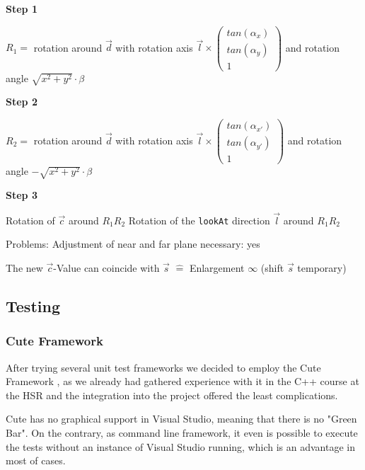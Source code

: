 \noindent\textbf{Step 1}

$R_{1} = $ rotation around $\overrightarrow{d}$ with rotation axis   $\overrightarrow{l} \times \left(\begin{smallmatrix}tan (\alpha_{x}) \\ tan (\alpha_{y}) \\ 1\end{smallmatrix}\right)$ and rotation angle $\sqrt{x^{2} + y^{2}} \cdot \beta $

\noindent\textbf{Step 2}

$R_{2} = $ rotation around $\overrightarrow{d}$ with rotation axis   $\overrightarrow{l} \times \left(\begin{smallmatrix}tan (\alpha_{x'}) \\ tan (\alpha_{y'}) \\ 1\end{smallmatrix}\right)$ and rotation angle $- \sqrt{x^{2} + y^{2}} \cdot \beta $

\noindent\textbf{Step 3}

Rotation of $\overrightarrow{c}$ around $R_{1}R_{2}$ \newline
\indent Rotation of the \verb|lookAt| direction $\overrightarrow{l}$ around $R_{1}R_{2}$ \newline

\noindent Problems: 
Adjustment of near and far plane necessary: yes

The new $\overrightarrow{c}$-Value can coincide with $\overrightarrow{s}$ $\mathrel{\widehat{=}}$ Enlargement $\infty$ (shift $\overrightarrow{s}$ temporary)
 
\subsection{Testing} \label{testing}

\subsubsection{Cute Framework}

After trying several unit test frameworks we decided to employ the Cute Framework \cite{cute}, as we already had gathered experience with it in the C++ course at the HSR and the integration into the project offered the least complications.

Cute has no graphical support in Visual Studio, meaning that there is no "Green Bar". On the contrary, as command line framework, it even is possible to execute the tests without an instance of Visual Studio running, which is an advantage in most of cases.


